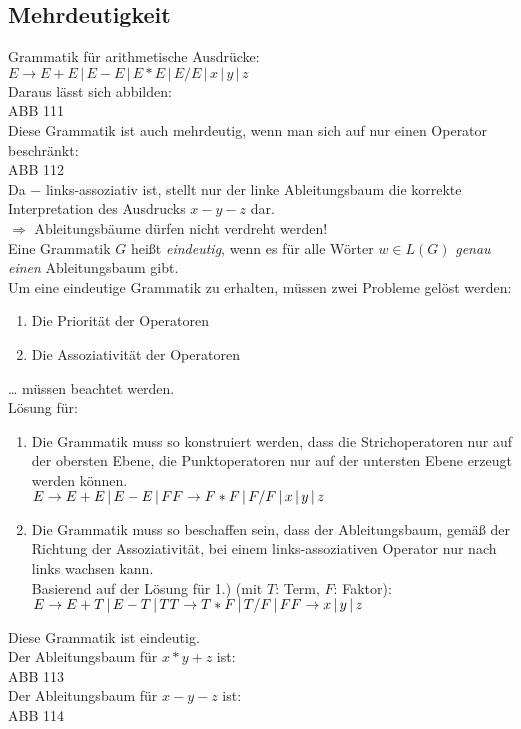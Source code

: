 \subsection{Mehrdeutigkeit}
Grammatik für arithmetische Ausdrücke:\\
$E\to E+E \,|\, E - E \,|\, E*E \,|\, E/E \,|\, x \,|\, y \,|\, z$\\
Daraus lässt sich abbilden:\\
ABB 111\\
Diese Grammatik ist auch mehrdeutig, wenn man sich auf nur einen Operator beschränkt:\\
ABB 112\\
Da $-$ links-assoziativ ist, stellt nur der linke Ableitungsbaum die korrekte Interpretation des Ausdrucks $x-y-z$ dar.\\
$\Rightarrow$ Ableitungsbäume dürfen nicht verdreht werden!\\
Eine Grammatik $G$ heißt \emph{eindeutig}, wenn es für alle Wörter $w \in L(G)$ \emph{genau einen} Ableitungsbaum gibt.\\
Um eine eindeutige Grammatik zu erhalten, müssen zwei Probleme gelöst werden:
\begin{enumerate}
\item Die Priorität der Operatoren
\item Die Assoziativität der Operatoren
\end{enumerate}
… müssen beachtet werden.\\
Lösung für:
\begin{enumerate}
\item Die Grammatik muss so konstruiert werden, dass die Strichoperatoren nur auf der obersten Ebene, die Punktoperatoren nur auf der untersten Ebene erzeugt werden können.\\
$E\to E+E \,|\, E-E \,|\, F \\
F \to F*F \,|\, F/F \,|\, x \,|\, y \,|\, z$
\item Die Grammatik muss so beschaffen sein, dass der Ableitungsbaum, gemäß der Richtung der Assoziativität, bei einem links-assoziativen Operator nur nach links wachsen kann.\\
Basierend auf der Lösung für 1.) (mit $T$: Term, $F$: Faktor):\\
$E\to E+T \,|\, E-T \,|\, T \\
T \to T*F \,|\, T/F \,|\, F\\
F \to x \,|\, y \,|\, z$
\end{enumerate}
Diese Grammatik ist eindeutig.\\
Der Ableitungsbaum für $x*y+z$ ist:\\
ABB 113\\
Der Ableitungsbaum für $x-y-z$ ist:\\
ABB 114

